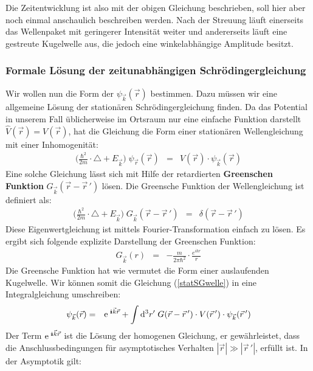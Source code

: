 Die Zeitentwicklung ist also mit der obigen Gleichung beschrieben, soll hier aber noch einmal anschaulich beschreiben werden. Nach der Streuung läuft einerseits das Wellenpaket mit geringerer Intensität weiter und andererseits läuft eine gestreute Kugelwelle aus, die jedoch eine winkelabhängige Amplitude besitzt.


\subsubsection{Formale Lösung der zeitunabhängigen Schrödingergleichung}\label{sec3.2}

Wir wollen nun die Form der $\psi_{\vec{k}}(\vec{r})$ bestimmen. Dazu müssen wir eine allgemeine Lösung der stationären Schrödingergleichung finden. Da das Potential in unserem Fall üblicherweise im Ortsraum nur eine einfache Funktion darstellt $\hat{V}(\vec{r})=V(\vec{r})$, hat die Gleichung die Form einer stationären Wellengleichung mit einer Inhomogenität: 
\begin{eqnarray}
	\Big( \frac{\hbar^2}{2m}\cdot \triangle + E_{\vec{k}}\Big)\;\psi_{\vec{r}}(\vec{r}) &=& V(\vec{r}) \cdot\psi_{\vec{k}}(\vec{r}) \label{statSGwelle}
\end{eqnarray}
Eine solche Gleichung lässt sich mit Hilfe der retardierten {\bf Greenschen Funktion} $G_{\vec{k}}(\vec{r}-\vec{r}\,')$ lösen. Die Greensche Funktion der Wellengleichung ist definiert als: 
\begin{eqnarray*}
	\Big( \frac{\hbar^2}{2m}\cdot\triangle + E_{\vec{k}}\Big)\; G_{\vec{k}}(\vec{r}- \vec{r}\,') &=& \delta(\vec{r} - \vec{r}\,')
\end{eqnarray*}
Diese Eigenwertgleichung ist mittels Fourier-Transformation einfach zu lösen. Es ergibt sich folgende explizite Darstellung der Greenschen Funktion:
\begin{eqnarray*}
	G_{\vec k}(r) &=& -\frac{m}{2\pi \hbar^2} \cdot \frac{e^{i k r}}{r}
\end{eqnarray*}
Die Greensche Funktion hat wie vermutet die Form einer auslaufenden Kugelwelle. Wir können somit die Gleichung (\ref{statSGwelle}) in eine Integralgleichung umschreiben:
\begin{eqnarray*}
	\psi_{\vec{k}}(\vec{r}) &=& \e^{\;\I\vec{k}\vec{r}} + \int\mathrm{d}^3 r'\; G(\vec{r}-\vec{r}\,')\cdot V(\vec{r}\,') \cdot\psi_{\vec{k}}(\vec{r}\,')
\end{eqnarray*}
Der Term $\e^{\;\I\vec{k}\vec{r}}$ ist die Lösung der homogenen Gleichung, er gewährleistet, dass die Anschlussbedingungen für asymptotisches Verhalten $|\vec{r}|\gg|\vec{r}\,'|$, erfüllt ist. In der Asymptotik gilt: 
